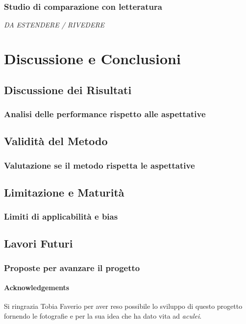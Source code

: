 \documentclass[12pt,a4paper,twoside]{article}
\begin{document}
\subsubsection{Studio di comparazione con letteratura}
\textit{DA ESTENDERE / RIVEDERE}

\newpage
\section{Discussione e Conclusioni}

\subsection{Discussione dei Risultati}
\subsubsection{Analisi delle performance rispetto alle aspettative}

\subsection{Validità del Metodo}
\subsubsection{Valutazione se il metodo rispetta le aspettative}

\subsection{Limitazione e Maturità}
\subsubsection{Limiti di applicabilità e bias}

\subsection{Lavori Futuri}
\subsubsection{Proposte per avanzare il progetto}

\newpage
\paragraph{Acknowledgements} Si ringrazia Tobia Faverio per aver reso possibile lo sviluppo di 
questo progetto fornendo le fotografie e per la sua idea che ha dato vita ad \textit{aculei}.

\newpage
\printbibliography
\end{document}
